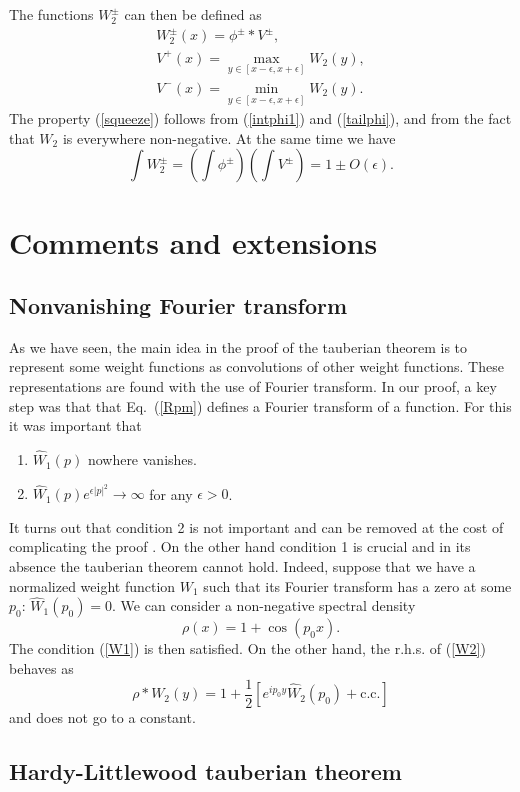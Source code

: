 \documentclass[12pt]{article}
\newcommand{\reef}[1]{(\ref{#1})}
\def\eps{\epsilon}
\newcommand{\beq}{\begin{equation}}
\newcommand{\eeq}{\end{equation}}
\def\half{{\textstyle\frac 12}}
\def\eps{\epsilon}
\numberwithin{equation}{section}
\begin{document}
The functions $W_2^\pm$ can then be defined as
\begin{gather}
W_2^\pm(x) = \phi^\pm * V^\pm,\\
V^+(x)=\max_{y\in[x-\eps,x+\eps]} W_2(y),\\
V^-(x)=\min_{y\in[x-\eps,x+\eps]} W_2(y).
\end{gather}
The property \reef{squeeze} follows from \reef{intphi1} and \reef{tailphi}, and from the fact that $W_2$ is everywhere non-negative. At the same time we have
\beq
\int W_2^{\pm} = \left(\int \phi^\pm\right)\left(\int V^\pm\right)=1\pm O(\eps).
\eeq

\section{Comments and extensions}

\subsection{Nonvanishing Fourier transform}
\label{nonvanish}

As we have seen, the main idea in the proof of the tauberian theorem is to represent some weight functions as convolutions of other weight functions. These representations are found with the use of Fourier transform.
In our proof, a key step was that that Eq.~\reef{Rpm} defines a Fourier transform of a function. For this it was important that 
\begin{enumerate}
\item
$\hat W_1(p)$ nowhere vanishes.
\item
$\hat W_1(p) e^{\eps |p|^2}\to\infty$ for any $\eps>0$.
\end{enumerate}
It turns out that condition 2 is not important and can be removed at the cost of complicating the proof \cite{Bochner,Bochner-collected}.
On the other hand condition 1 is crucial and in its absence the tauberian theorem cannot hold. Indeed, suppose that we have a normalized weight function $W_1$ such that its Fourier transform has a zero at some $p_0$: $\hat W_1(p_0)=0$. We can consider a non-negative spectral density
\beq
\rho(x)= 1+\cos(p_0 x).
\eeq
The condition \reef{W1} is then satisfied. On the other hand, the r.h.s. of \reef{W2} behaves as
\beq
\rho*W_2(y)= 1+ \half [e^{ip_0 y} \hat W_2(p_0)+ \text{c.c.}]
\eeq
and does not go to a constant.

\subsection{Hardy-Littlewood tauberian theorem}
\label{HL}
\end{document}
